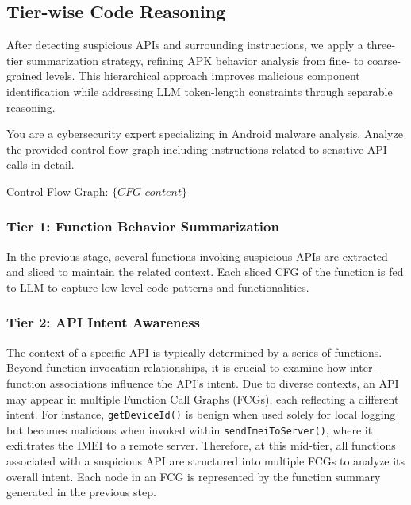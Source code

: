 \subsection{Tier-wise Code Reasoning}
After detecting suspicious APIs and surrounding instructions, we apply a three-tier summarization strategy, refining APK behavior analysis from fine- to coarse-grained levels. This hierarchical approach improves malicious component identification while addressing LLM token-length constraints through separable reasoning. 


\begin{tcolorbox}[title=Tier 1: Function Behavior Summarization Prompt, colback=gray!20, colframe=black, colbacktitle=black, coltitle=white, sharp corners, fontupper=\small, fontlower=\small, before upper=\raggedright, before lower=\raggedright]
You are a cybersecurity expert specializing in Android malware analysis. Analyze the provided control flow graph including instructions related to sensitive API calls in detail.

Control Flow Graph: $\{CFG\_content\}$
\end{tcolorbox}

\subsubsection{Tier 1: Function Behavior Summarization}
In the previous stage, several functions invoking suspicious APIs are extracted and sliced to maintain the related context. Each sliced CFG of the function is fed to LLM to capture low-level code patterns and functionalities. 



\subsubsection{Tier 2: API Intent Awareness}
The context of a specific API is typically determined by a series of functions. Beyond function invocation relationships, it is crucial to examine how inter-function associations influence the API's intent. Due to diverse contexts, an API may appear in multiple Function Call Graphs (FCGs), each reflecting a different intent. For instance, \verb|getDeviceId()| is benign when used solely for local logging but becomes malicious when invoked within \verb|sendImeiToServer()|, where it exfiltrates the IMEI to a remote server. Therefore, at this mid-tier, all functions associated with a suspicious API are structured into multiple FCGs to analyze its overall intent. Each node in an FCG is represented by the function summary generated in the previous step. 

